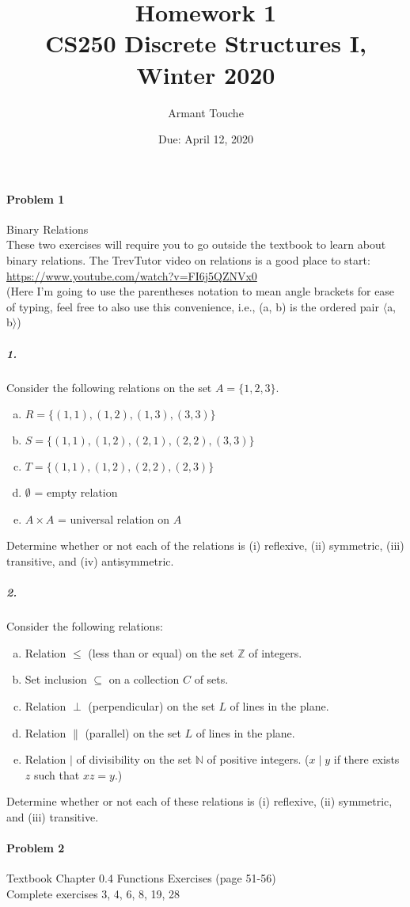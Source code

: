 \documentclass[11pt, a4paper]{article}
\title{\bf Homework 1\\[1ex]
\rm\normalsize CS250 Discrete Structures I, Winter 2020 }
\date{\normalsize Due: April 12, 2020}
\author{\normalsize Armant Touche}
\newcommand{\stuple}[1]{$\langle$#1$\rangle$} %
\begin{document}
 
\vspace{0cm}\maketitle 
	\paragraph{Problem 1} Binary Relations\\
	These two exercises will require you to go outside the textbook to learn about binary relations. The TrevTutor video on relations is a good place to start: \url{https://www.youtube.com/watch?v=FI6j5QZNVx0}\\
	(Here I'm going to use the parentheses notation to mean angle brackets for ease of typing, feel free to also use this convenience, i.e., (a, b) is the ordered pair \stuple{a, b})
		\subparagraph{1.} Consider the following relations on the set $A = \{1, 2, 3\}$.
		\begin{enumerate}[a)]
			\item $R = \{(1, 1), (1, 2), (1, 3), (3, 3)\}$
			\item $S = \{(1, 1), (1, 2), (2, 1), (2, 2), (3, 3)\}$
			\item $T = \{(1, 1), (1, 2), (2, 2), (2, 3)\}$
			\item $\emptyset$ = empty relation
			\item $A \times A$ = universal relation on $A$
		\end{enumerate}
		Determine whether or not each of the relations is (i) reflexive, (ii) symmetric, (iii) transitive, and (iv) antisymmetric.
		
		\subparagraph{2.} Consider the following relations:
		
		\begin{enumerate}[a)]
			\item Relation $\leq$ (less than or equal) on the set $\mathbb{Z}$ of integers.
			\item Set inclusion $\subseteq$ on a collection $C$ of sets.
			\item Relation $\perp$ (perpendicular) on the set $L$ of lines in the plane.
			\item Relation $\parallel$ (parallel) on the set $L$ of lines in the plane.
			\item Relation $\mid$ of divisibility on the set $\mathbb{N}$ of positive integers. ($x \mid y$ if there exists $z$ such that $xz = y$.)
		\end{enumerate}
		
		Determine whether or not each of these relations is (i) reflexive, (ii) symmetric, and (iii) transitive.	

	\paragraph{Problem 2} Textbook Chapter 0.4 Functions Exercises (page 51-56)\\
	
	Complete exercises 3, 4, 6, 8, 19, 28
		
\end{document}
